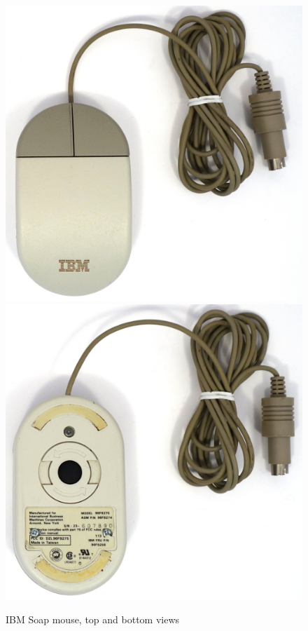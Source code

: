 \documentclass[11pt, a4paper]{article}
\begin{document}
\begin{figure}[h]
    \centering
    \includegraphics[scale=0.5]{1992_ibm_soap_mouse/top_60.jpg}
    \includegraphics[scale=0.5]{1992_ibm_soap_mouse/bottom_60.jpg}
    \caption{IBM Soap mouse, top and bottom views}
    \label{fig:IBMSoapTopBottom}
\end{figure}
\end{document}
